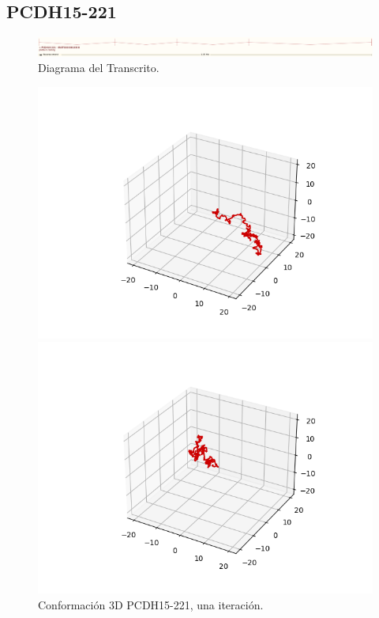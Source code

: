 \documentclass[a4paper,11pt,titlepage]{article}
\theoremstyle{definition}
\begin{document}
\newpage
\subsection*{PCDH15-221}\label{subsec:gene2}

\begin{figure}[H]
    \centering
    \includegraphics[width=\textwidth]{images/PCDH15-221.png}
    \caption{Diagrama del Transcrito.}
    \label{fig:PCDH15-221-diag}
\end{figure}

\begin{figure}[H]
    \centering
    \begin{minipage}[c]{0.31\textwidth}
        \centering
        \includegraphics[width=\textwidth]{images/PCDH15-221-db_one.png}
        \caption{Conformación 3D PCDH15-221, una iteración.}
        \label{fig:PCDH15-221-one}
    \end{minipage}
    \hfill
    \begin{minipage}[c]{0.31\textwidth}
        \centering
        \includegraphics[width=\textwidth]{images/PCDH15-221-db_iter.png}

\end{minipage}
\end{figure}
\end{document}
